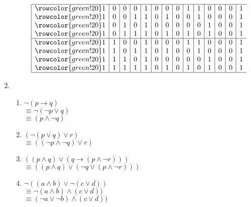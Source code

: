 \documentclass{article}
\begin{document}
\begin{enumerate}[label=(\alph*)]
\begin{enumerate}[label=\roman*.]
\begin{displaymath}
\begin{array}{|c|c|c|c|c|c|c|c|c|c|c|c|c|c}
            \hline
            \rowcolor{green!20}
            1 & 0 & 0 & 0 & 1 & 0 & 0 & 0 & 1 & 1 & 0 & 0 & 0 & 1 \\
            \rowcolor{green!20}
            1 & 0 & 0 & 1 & 1 & 0 & 1 & 0 & 0 & 1 & 0 & 0 & 0 & 1 \\
            \rowcolor{green!20}
            1 & 0 & 1 & 0 & 1 & 0 & 0 & 0 & 0 & 0 & 1 & 0 & 0 & 1 \\
            \rowcolor{green!20}
            1 & 0 & 1 & 1 & 1 & 0 & 1 & 0 & 1 & 0 & 1 & 0 & 0 & 1 \\
            \hline
            \rowcolor{green!20}
            1 & 1 & 0 & 0 & 1 & 0 & 0 & 0 & 1 & 1 & 0 & 0 & 0 & 1 \\
            \rowcolor{green!20}
            1 & 1 & 0 & 1 & 1 & 0 & 1 & 0 & 0 & 1 & 0 & 0 & 0 & 1 \\
            \rowcolor{green!20}
            1 & 1 & 1 & 0 & 1 & 0 & 0 & 0 & 0 & 0 & 1 & 0 & 0 & 1 \\
            \rowcolor{green!20}
            1 & 1 & 1 & 1 & 1 & 0 & 1 & 0 & 1 & 0 & 1 & 0 & 0 & 1 \\
            \hline
            \end{array}
        \end{displaymath}
        
    \end{enumerate}
    
    \item 
    \begin{enumerate}[label=\roman*.]
        \item 
        \quad $\neg{}(p\rightarrow{}q)$ \\
        \quad $\equiv{}\neg{}(\neg{}p\lor{}q)$ \\
        \quad $\equiv{}({}p\land{}\neg{}q)$ \\
        
        \item 
        \quad $(\neg{}(p\lor{}q)\lor{}r)$ \\
        \quad $\equiv{}((\neg{}p\land{}\neg{}q)\lor{}r)$ \\
        
        \item 
        \quad $((p\land{}q)\lor(q\rightarrow{}(p\land{}\neg{}r)))$ \\
        \quad $\equiv{}((p\land{}q)\lor(\neg{}q\lor{}(p\land{}\neg{}r)))$ \\
        
        \item 
        \quad $\neg((a\land{}b)\lor{}\neg{}(c\lor{}d))$ \\
        \quad $\equiv{}\neg{}(a\land{}b)\land{}(c\lor{}d))$ \\
        \quad $\equiv{}(\neg{}a\lor{}\neg{}b)\land{}(c\lor{}d))$ \\
        

\end{enumerate}
\end{enumerate}
\end{document}
